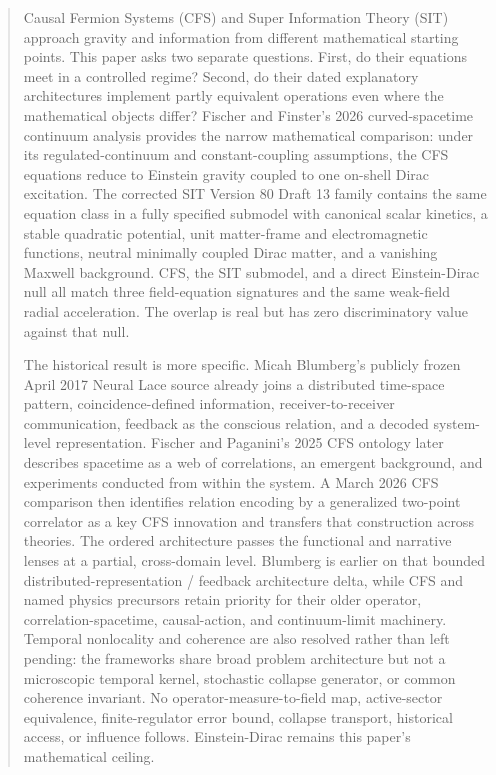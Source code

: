 \documentclass[
  american,
  11pt,
  letterpaper,
]{article}
\begin{document}
\begin{abstract}

Causal Fermion Systems (CFS) and Super Information Theory (SIT) approach gravity and information from different mathematical starting points. This paper asks two separate questions. First, do their equations meet in a controlled regime? Second, do their dated explanatory architectures implement partly equivalent operations even where the mathematical objects differ? Fischer and Finster's 2026 curved-spacetime continuum analysis provides the narrow mathematical comparison: under its regulated-continuum and constant-coupling assumptions, the CFS equations reduce to Einstein gravity coupled to one on-shell Dirac excitation. The corrected SIT Version 80 Draft 13 family contains the same equation class in a fully specified submodel with canonical scalar kinetics, a stable quadratic potential, unit matter-frame and electromagnetic functions, neutral minimally coupled Dirac matter, and a vanishing Maxwell background. CFS, the SIT submodel, and a direct Einstein-Dirac null all match three field-equation signatures and the same weak-field radial acceleration. The overlap is real but has zero discriminatory value against that null.

The historical result is more specific. Micah Blumberg's publicly frozen April 2017 Neural Lace source already joins a distributed time-space pattern, coincidence-defined information, receiver-to-receiver communication, feedback as the conscious relation, and a decoded system-level representation. Fischer and Paganini's 2025 CFS ontology later describes spacetime as a web of correlations, an emergent background, and experiments conducted from within the system. A March 2026 CFS comparison then identifies relation encoding by a generalized two-point correlator as a key CFS innovation and transfers that construction across theories. The ordered architecture passes the functional and narrative lenses at a partial, cross-domain level. Blumberg is earlier on that bounded distributed-representation / feedback architecture delta, while CFS and named physics precursors retain priority for their older operator, correlation-spacetime, causal-action, and continuum-limit machinery. Temporal nonlocality and coherence are also resolved rather than left pending: the frameworks share broad problem architecture but not a microscopic temporal kernel, stochastic collapse generator, or common coherence invariant. No operator-measure-to-field map, active-sector equivalence, finite-regulator error bound, collapse transport, historical access, or influence follows. Einstein-Dirac remains this paper's mathematical ceiling.

\end{abstract}
\end{document}
